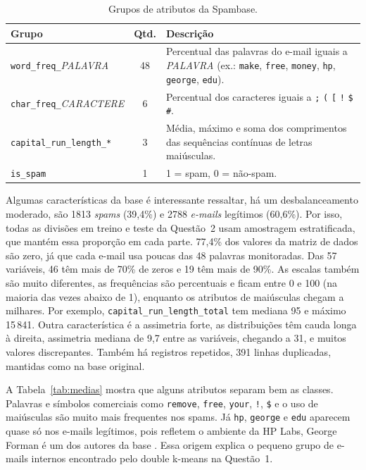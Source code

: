 \documentclass[12pt,reqno]{amsart}
\begin{document}
\begin{table}[H]
\centering
\caption{Grupos de atributos da Spambase.}
\label{tab:atributos}
\small
\begin{tabular}{p{}cp{}}
\toprule
Grupo & Qtd. & Descrição \\
\midrule
\texttt{word\_freq\_}\emph{PALAVRA} & 48 & Percentual das palavras do e-mail iguais a
\emph{PALAVRA} (ex.: \texttt{make}, \texttt{free}, \texttt{money}, \texttt{hp}, \texttt{george}, \texttt{edu}). \\
\texttt{char\_freq\_}\emph{CARACTERE} & 6 & Percentual dos caracteres iguais a
\texttt{;} \texttt{(} \texttt{[} \texttt{!} \texttt{\$} \texttt{\#}. \\
\texttt{capital\_run\_length\_*} & 3 & Média, máximo e
soma dos comprimentos das sequências contínuas de letras maiúsculas. \\
\midrule
\texttt{is\_spam} & 1 & 1 = spam, 0 = não-spam. \\
\bottomrule
\end{tabular}
\end{table}


Algumas características da base é interessante ressaltar, há um desbalanceamento moderado, são 1813 \emph{spams} (39,4\%) e 2788
\emph{e-mails} legítimos (60,6\%). Por isso, todas as divisões em treino e teste da Questão~2 usam
amostragem estratificada, que mantém essa proporção em cada parte. 77,4\% dos valores da matriz de dados são zero, já que cada e-mail usa poucas das 48 palavras monitoradas. Das 57 variáveis, 46 têm mais de 70\% de zeros e 19 têm mais de 90\%.
As escalas também são muito diferentes, as frequências são percentuais e ficam entre 0 e 100 (na maioria das
  vezes abaixo de 1), enquanto os atributos de maiúsculas chegam a milhares. Por exemplo,
  \texttt{capital\_run\_length\_total} tem mediana 95 e máximo 15\,841.
Outra característica é a assimetria forte, as distribuições têm cauda longa à direita, assimetria mediana
  de 9,7 entre as variáveis, chegando a 31, e muitos valores discrepantes.
Também há registros repetidos, 391 linhas duplicadas, mantidas como na base original.


A Tabela~\ref{tab:medias} mostra que alguns atributos separam bem as classes. Palavras e
símbolos comerciais como \texttt{remove}, \texttt{free}, \texttt{your}, \texttt{!}, \texttt{\$} e o
uso de maiúsculas são muito mais frequentes nos spams. Já \texttt{hp}, \texttt{george} e
\texttt{edu} aparecem quase só nos e-mails legítimos, pois refletem o ambiente da HP Labs, George Forman é um dos autores da base \cite{spambase}. Essa origem explica o pequeno grupo de e-mails
internos encontrado pelo double k-means na Questão~1.
\end{document}
